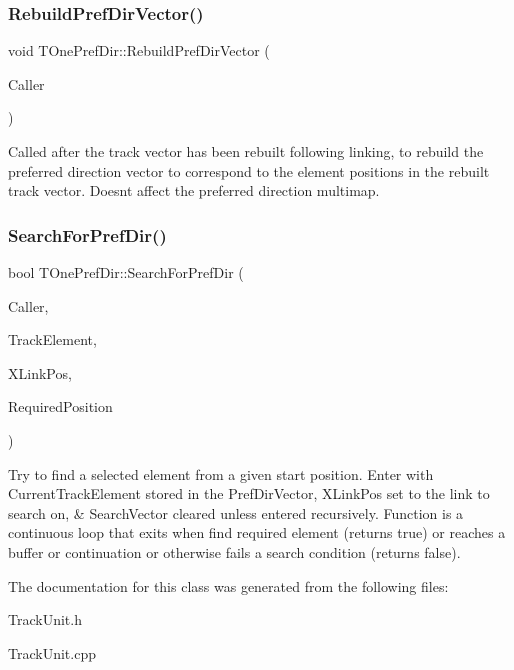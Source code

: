 \subsubsection{\texorpdfstring{Rebuild\+Pref\+Dir\+Vector()}{RebuildPrefDirVector()}}
{\footnotesize\ttfamily void T\+One\+Pref\+Dir\+::\+Rebuild\+Pref\+Dir\+Vector (\begin{DoxyParamCaption}\item[{int}]{Caller }\end{DoxyParamCaption})}

Called after the track vector has been rebuilt following linking, to rebuild the preferred direction vector to correspond to the element positions in the rebuilt track vector. Doesn\textquotesingle{}t affect the preferred direction multimap. \mbox{\label{class_t_one_pref_dir_a82c6a19d67ada7059491afae05ced4a4}} 
\subsubsection{\texorpdfstring{Search\+For\+Pref\+Dir()}{SearchForPrefDir()}}
{\footnotesize\ttfamily bool T\+One\+Pref\+Dir\+::\+Search\+For\+Pref\+Dir (\begin{DoxyParamCaption}\item[{int}]{Caller,  }\item[{\mbox{\hyperlink{class_t_track_element}{T\+Track\+Element}}}]{Track\+Element,  }\item[{int}]{X\+Link\+Pos,  }\item[{int}]{Required\+Position }\end{DoxyParamCaption})\hspace{0.3cm}{\ttfamily [protected]}}

Try to find a selected element from a given start position. Enter with Current\+Track\+Element stored in the Pref\+Dir\+Vector, X\+Link\+Pos set to the link to search on, \& Search\+Vector cleared unless entered recursively. Function is a continuous loop that exits when find required element (returns true) or reaches a buffer or continuation or otherwise fails a search condition (returns false). 

The documentation for this class was generated from the following files\+:\begin{DoxyCompactItemize}
\item 
Track\+Unit.\+h\item 
Track\+Unit.\+cpp\end{DoxyCompactItemize}
